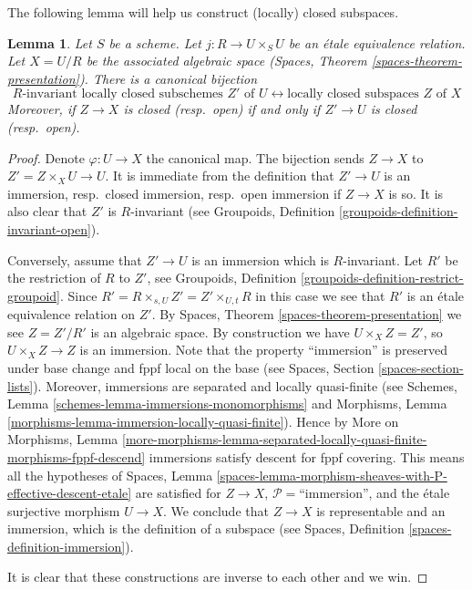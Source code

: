 \documentclass{stacks-project}
\theoremstyle{plain}
\newtheorem{lemma}[subsection]{Lemma}
\theoremstyle{definition}
\theoremstyle{remark}
\numberwithin{equation}{subsection}
\begin{document}
\noindent
The following lemma will help us construct
(locally) closed subspaces.

\begin{lemma}
\label{lemma-subspaces-presentation}
Let $S$ be a scheme. Let $j : R \to U \times_S U$ be an \'etale equivalence
relation. Let $X = U/R$ be the associated algebraic space
(Spaces, Theorem \ref{spaces-theorem-presentation}). There is a
canonical bijection
$$
R\text{-invariant locally closed subschemes }Z'\text{ of }U
\leftrightarrow
\text{locally closed subspaces }Z\text{ of }X
$$
Moreover, if $Z \to X$ is closed (resp.\ open) if and only if
$Z' \to U$ is closed (resp.\ open).
\end{lemma}

\begin{proof}
Denote $\varphi : U \to X$ the canonical map. The bijection sends
$Z \to X$ to $Z' = Z \times_X U \to U$. It is immediate from the definition
that $Z' \to U$ is an immersion, resp.\ closed immersion, resp.\ open
immersion if $Z \to X$ is so. It is also clear that $Z'$ is $R$-invariant
(see Groupoids, Definition \ref{groupoids-definition-invariant-open}).

\medskip\noindent
Conversely, assume that $Z' \to U$ is an immersion which is $R$-invariant.
Let $R'$ be the restriction of $R$ to $Z'$, see
Groupoids, Definition \ref{groupoids-definition-restrict-groupoid}.
Since $R' = R \times_{s, U} Z' = Z' \times_{U, t} R$ in this case
we see that $R'$ is an \'etale equivalence relation on $Z'$. By
Spaces, Theorem \ref{spaces-theorem-presentation} we see
$Z = Z'/R'$ is an algebraic space. By construction we have
$U \times_X Z = Z'$, so $U \times_X Z \to Z$ is an immersion.
Note that the property ``immersion'' is preserved under base change
and fppf local on the base (see Spaces, Section \ref{spaces-section-lists}).
Moreover, immersions are separated and locally quasi-finite (see
Schemes, Lemma \ref{schemes-lemma-immersions-monomorphisms}
and
Morphisms, Lemma \ref{morphisms-lemma-immersion-locally-quasi-finite}).
Hence by More on Morphisms, Lemma
\ref{more-morphisms-lemma-separated-locally-quasi-finite-morphisms-fppf-descend}
immersions satisfy descent for fppf covering. This means all the hypotheses of
Spaces,
Lemma \ref{spaces-lemma-morphism-sheaves-with-P-effective-descent-etale}
are satisfied for $Z \to X$, $\mathcal{P}=$``immersion'',
and the \'etale surjective morphism $U \to X$. We conclude that $Z \to X$
is representable and an immersion, which is the
definition of a subspace (see
Spaces, Definition \ref{spaces-definition-immersion}).

\medskip\noindent
It is clear that these constructions are inverse to each other and we win.
\end{proof}
\end{document}
